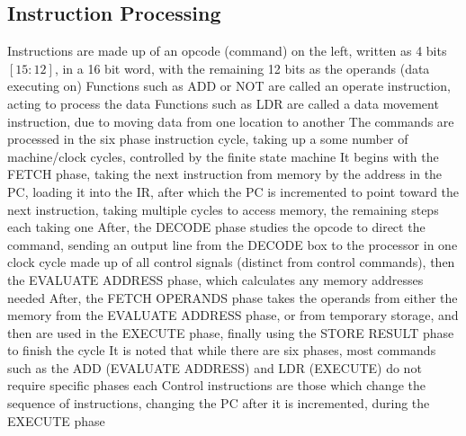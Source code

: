 \documentclass[11 pt, twoside]{article}
\newenvironment{outline*}
{
	\begin{outline}[enumerate]
	}
	{\end{outline}
}
\begin{document}
\subsection{Instruction Processing}
\begin{outline*}
\1 Instructions are made up of an opcode (command) on the left, written as 4 bits $[15:12]$, in a 16 bit word, with the remaining 12 bits as the operands (data executing on)
\2 Functions such as ADD or NOT are called an operate instruction, acting to process the data
\2 Functions such as LDR are called a data movement instruction, due to moving data from one location to another
\1 The commands are processed in the six phase instruction cycle, taking up a some number of machine/clock cycles, controlled by the finite state machine
\2 It begins with the FETCH phase, taking the next instruction from memory by the address in the PC, loading it into the IR, after which the PC is incremented to point toward the next instruction, taking multiple cycles to access memory, the remaining steps each taking one
\2 After, the DECODE phase studies the opcode to direct the command, sending an output line from the DECODE box to the processor in one clock cycle made up of all control signals (distinct from control commands), then the EVALUATE ADDRESS phase, which calculates any memory addresses needed
\2 After, the FETCH OPERANDS phase takes the operands from either the memory from the EVALUATE ADDRESS phase, or from temporary storage, and then are used in the EXECUTE phase, finally using the STORE RESULT phase to finish the cycle
\2 It is noted that while there are six phases, most commands such as the ADD (EVALUATE ADDRESS) and LDR (EXECUTE) do not require specific phases each
\1 Control instructions are those which change the sequence of instructions, changing the PC after it is incremented, during the EXECUTE phase
\end{outline*}
\end{document}
